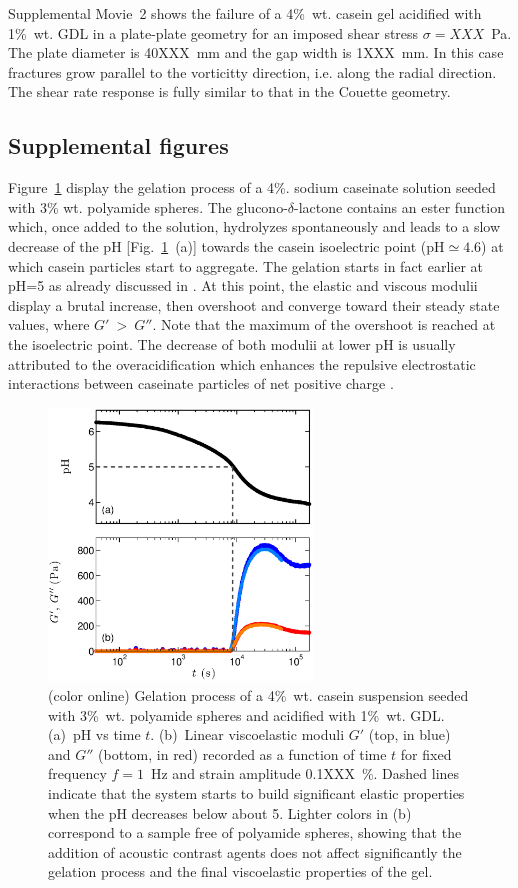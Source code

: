 \documentclass[twocolumn,superscriptaddress,showpacs,preprintnumbers,amsmath,amssymb,prl]{revtex4}
\begin{document}
Supplemental Movie~2 shows the failure of a 4\%~wt. casein gel acidified with 1\%~wt. GDL in a plate-plate geometry for an imposed shear stress $\sigma=XXX$~Pa. The plate diameter is 40XXX~mm and the gap width is 1XXX~mm. In this case fractures grow parallel to the vorticitty direction, i.e. along the radial direction. The shear rate response is fully similar to that in the Couette geometry.

\subsection*{Supplemental figures} 

Figure~\ref{suppfig1} display the gelation process of a 4\%. sodium caseinate solution seeded with 3\% wt. polyamide spheres. The glucono-$\delta$-lactone contains an ester function which, once added to the solution, hydrolyzes spontaneously and leads to a slow decrease of the pH [Fig.~\ref{suppfig1}~(a)] towards the casein isoelectric point (pH$\simeq 4.6$) at which casein particles start to aggregate. The gelation starts in fact earlier at pH=5 as already discussed in \cite{Lucey:1998supp}. At this point, the elastic and viscous modulii display a brutal increase, then overshoot and converge toward their steady state values, where $G'~>~G''$. Note that the maximum of the overshoot is reached at the isoelectric point. The decrease of both modulii at lower pH is usually attributed to the overacidification which enhances the repulsive electrostatic interactions between caseinate particles of net positive charge \cite{Dickinson:2002supp}.   

\begin{figure}[h]
\centering
\includegraphics[width=7cm,clip]{SuppFig1.eps}
\caption{(color online) Gelation process of a 4\%~wt. casein suspension seeded with 3\%~wt. polyamide spheres and acidified with 1\%~wt. GDL. (a)~pH vs time $t$. (b)~Linear viscoelastic moduli $G'$ (top, in blue) and $G''$ (bottom, in red) recorded as a function of time $t$ for fixed frequency $f=1$~Hz and strain amplitude 0.1XXX~\%. Dashed lines indicate that the system starts to build significant elastic properties when the pH decreases below about 5. Lighter colors in (b) correspond to a sample free of polyamide spheres, showing that the addition of acoustic contrast agents does not affect significantly the gelation process and the final viscoelastic properties of the gel.
\label{suppfig1}}
\end{figure} 
\end{document}
